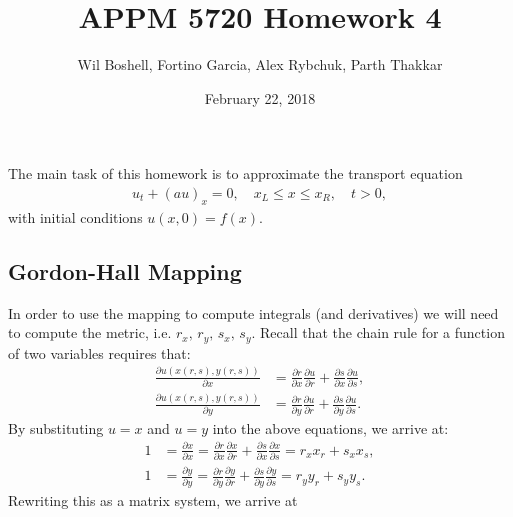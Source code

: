 \documentclass{article}
\title{APPM 5720 Homework 4}
\author{Wil Boshell, Fortino Garcia, Alex Rybchuk, Parth Thakkar}
\date{February 22, 2018}
\newcommand{\pdiff}[2]{\frac{\partial {#1}}{\partial {#2}}}
\begin{document}
\maketitle

\maketitle

\noindent The main task of this homework is to approximate the transport equation
	\begin{align*}
		u_t + \left( a u\right)_x = 0, \quad x_L \leq x \leq x_R, \quad t > 0,
	\end{align*}
with initial conditions $u(x,0) = f(x)$.
\subsection{Gordon-Hall Mapping}
\noindent In order to use the mapping to compute integrals (and derivatives) we will need to compute the metric, i.e. $r_x, \, r_y, \, s_x, \, s_y$. Recall that the chain rule for a function of two variables requires that:
  \begin{align*}
    \pdiff{u(x(r,s),y(r,s))}{x} & = \pdiff{r}{x}\pdiff{u}{r} + \pdiff{s}{x} \pdiff{u}{s}, \\
    \pdiff{u(x(r,s),y(r,s))}{y} & = \pdiff{r}{y}\pdiff{u}{r} + \pdiff{s}{y} \pdiff{u}{s}.
  \end{align*}
By substituting $u = x$ and $u = y$ into the above equations, we arrive at:
  \begin{align*}
    1 & = \pdiff{x}{x} = \pdiff{r}{x}\pdiff{x}{r} + \pdiff{s}{x} \pdiff{x}{s} = r_x x_r + s_x x_s, \\
    1 & = \pdiff{y}{y}  = \pdiff{r}{y}\pdiff{y}{r} + \pdiff{s}{y} \pdiff{y}{s} = r_y y_r + s_y y_s.  
  \end{align*}
Rewriting this as a matrix system, we arrive at 
\end{document}
